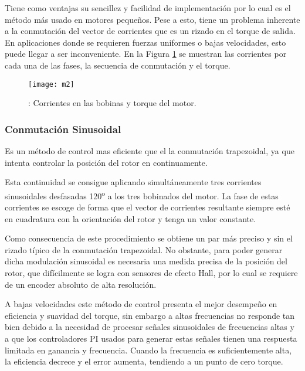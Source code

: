 Tiene como ventajas su sencillez y facilidad de implementación por lo cual es el método más usado en motores pequeños. Pese a esto, tiene un problema inherente a la conmutación del vector de corrientes que es un rizado en el torque de salida. En aplicaciones donde se requieren fuerzas uniformes o bajas velocidades, esto puede llegar a ser inconveniente. En la Figura \ref{fig:corrientes_bobinas} se muestran las corrientes por cada una de las fases, la secuencia de conmutación y el torque.

\begin{figure}[h]
  \centering
  \texttt{[image: m2]}
  \caption{: Corrientes en las bobinas y torque del motor.}\label{fig:corrientes_bobinas}
\end{figure}

\cite{brushless_control}


\subsubsection{Conmutación Sinusoidal}
\label{subsubsection: conmutacion_sin}

Es un método de control mas eficiente que el la conmutación trapezoidal, ya que intenta controlar la posición del rotor en continuamente.

Esta continuidad se consigue aplicando simultáneamente tres corrientes sinusoidales
desfasadas 120\textsuperscript{o} a los tres bobinados del motor. La fase de estas corrientes se escoge de forma que el vector de corrientes resultante siempre esté en cuadratura con la orientación del rotor y tenga un valor constante.

Como consecuencia de este procedimiento se obtiene un par más preciso y sin el rizado típico de la conmutación trapezoidal. No obstante, para poder generar dicha modulación sinusoidal es necesaria una medida precisa de la posición del rotor, que difícilmente se logra con sensores de efecto Hall, por lo cual se requiere de un encoder absoluto de alta resolución.

A bajas velocidades este método de control presenta el mejor desempeño en eficiencia y suavidad del torque, sin embargo a altas frecuencias no responde tan bien debido a la necesidad de procesar señales sinusoidales de frecuencias altas y a que los controladores PI usados para generar estas señales tienen una respuesta limitada en ganancia y frecuencia. Cuando la frecuencia es suficientemente alta, la eficiencia decrece y el error aumenta, tendiendo a un punto de cero torque.

